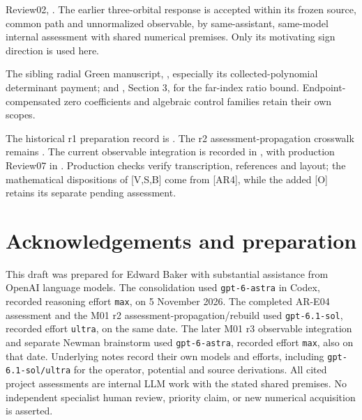 \documentclass[11pt,letterpaper]{article}
\numberwithin{equation}{section}
\theoremstyle{remark}
\newcommand{\evid}[1]{\textsf{[#1]}}
\begin{document}
\begin{description}[style=nextline,leftmargin=1.4cm]
\item[\evid{E4}] Review02,
.
The earlier three-orbital response is accepted within its frozen
source, common path and unnormalized observable, by same-assistant,
same-model internal assessment with shared numerical premises.
Only its motivating sign direction is used here.

\item[\evid{RGD}] The sibling radial Green manuscript,
,
especially its collected-polynomial determinant payment; and
,
Section 3, for the far-index ratio bound.
Endpoint-compensated zero coefficients and algebraic control
families retain their own scopes.
\end{description}

The historical r1 preparation record is
.
The r2 assessment-propagation crosswalk remains
.
The current observable integration is recorded in
,
with production Review07 in .
Production checks verify transcription, references and layout;
the mathematical dispositions of \evid{V,S,B} come from \evid{AR4},
while the added \evid{O} retains its separate pending assessment.

\section*{Acknowledgements and preparation}
This draft was prepared for Edward Baker with substantial assistance
from OpenAI language models. The consolidation used
\texttt{gpt-6-astra} in Codex, recorded reasoning effort
\texttt{max}, on 5 November 2026. The completed AR-E04 assessment and
the M01 r2 assessment-propagation/rebuild used \texttt{gpt-6.1-sol},
recorded effort \texttt{ultra}, on the same date. The later M01 r3
observable integration and separate Newman brainstorm used
\texttt{gpt-6-astra}, recorded effort \texttt{max}, also on that date.
Underlying notes record their own models and efforts, including
\texttt{gpt-6.1-sol/ultra} for the operator, potential and source
derivations. All cited project assessments are internal LLM work
with the stated shared premises. No independent specialist human
review, priority claim, or new numerical acquisition is asserted.
\end{document}
